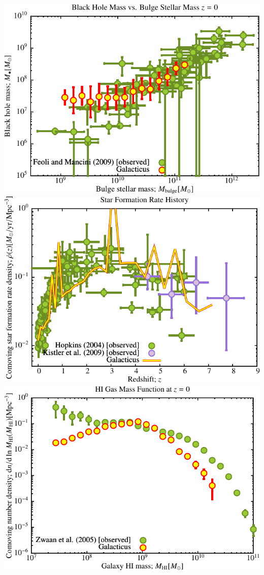 \includegraphics[scale=0.6]{drd5_r256_2/Plot_Black_Hole_vs_Bulge_Mass.pdf}
\includegraphics[scale=0.6]{drd5_r256_2/Plot_Star_Formation_History.pdf}
\includegraphics[scale=0.6]{drd5_r256_2/Plot_HI_Mass_Function.pdf}

